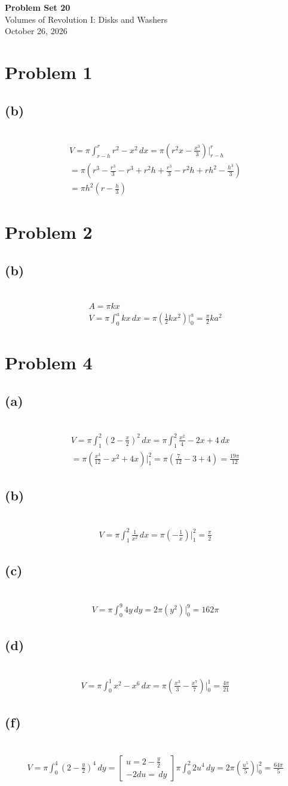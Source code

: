 \documentclass[12pt]{article}
\newcommand{\problem}[1]{\section{Problem #1}}
\newcommand{\subproblem}[1]{\subsection{(#1)} \,}
\begin{document}
\vspace*{0cm}

\begin{center}
    {\Large \bfseries Problem Set 20} \\[0.5cm]
    {\large Volumes of Revolution I: Disks and Washers} \\[0.35cm]
    {\normalsize October 26, 2026}
\end{center}


\problem{1}

\subproblem{b}
\begin{gather*}
    V=\pi \int_{r-h}^{r} r^2-x^2\, dx = \pi (r^2 x-\frac{x^3}{3})\Big|_{r-h}^{r}\\
    =\pi (r^3-\frac{r^3}{3} - r^3 + r^2h + \frac{r^3}{3}-r^2h+rh^2-\frac{h^3}{3})\\
    = \boxed{\pi h^2(r-\frac{h}{3})}
\end{gather*}

\problem{2}

\subproblem{b}
\begin{gather*}
    A=\pi kx\\
    V=\pi \int_0^ a kx \, dx=\pi (\frac{1}{2}kx^2)\Big|^a_0= \boxed{\frac{\pi}{2}ka^2} 
\end{gather*}

\problem{4}

\subproblem{a}
\begin{gather*}
    V=\pi \int_1^2(2-\frac{x}{2})^2\, dx = \pi \int_1^2 \frac{x^2}{4}-2x+4\, dx\\
    =\pi (\frac{x^3}{12}- x^2+4x)\Big|_1^2 =\pi (\frac{7}{12}-3+4)=\boxed{\frac{19\pi}{12}}
\end{gather*}

\subproblem{b}
\begin{gather*}
    V=\pi \int_1^2 \frac{1}{x^2}\, dx=\pi (-\frac{1}{x})\Big|_1^2=\boxed{\frac{\pi}{2}}
\end{gather*}

\subproblem{c}
\begin{gather*}
    V=\pi \int_0^9 4y\, dy =2\pi (y^2)\Big|^9_0=\boxed{162\pi }
\end{gather*}

\subproblem{d}
\begin{gather*}
    V=\pi \int_0^1x^2-x^6\, dx =\pi (\frac{x^3}{3}-\frac{x^7}{7})\Big|^1_0= \boxed{\frac{4\pi}{21}}
\end{gather*}

\subproblem{f}
\begin{gather*}
    V=\pi \int_0^4 (2-\frac{y}{2})^4\, dy = \begin{bmatrix}
        u=2-\frac{y}{2}\\
        -2du=\, dy
    \end{bmatrix}
    \pi \int_0^2 2u^4\, dy= 2\pi (\frac{u^5}{5})\Big|^2_0=\boxed{\frac{64\pi}{5}}
\end{gather*}
\end{document}
